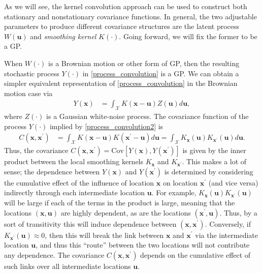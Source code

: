 \documentclass[12pt]{article}
\newcommand{\Cov}{\mathrm{Cov}}
\newcommand{\Ker}{K}
\newcommand{\covFun}{C}
\newcommand{\locSpace}{\mathcal{X}}
\newcommand{\loc}{\mathbf{x}}
\newcommand{\locTwo}{\loc^\prime}
\newcommand{\locDum}{\mathbf{u}}
\newcommand{\rf}{Y}
\begin{document}
As we will see, the kernel convolution approach can be used to construct both stationary and nonstationary covariance functions. In general, the two adjustable parameters to produce different 
covariance structures are the latent process $W(\locDum)$ and \textit{smoothing kernel} $\Ker(\cdot)$. Going forward, we will fix the former to be a GP. 

When $W(\cdot)$ is a Brownian motion or other form of GP, then the resulting stochastic process $\rf(\cdot)$ in \ref{process_convolution} is a 
GP. We can obtain a simpler equivalent representation of \ref{process_convolution} in the Brownian motion case via
\begin{align}
\rf(\loc) &= \int_{\locSpace} \Ker(\loc - \locDum) Z(\locDum) d\locDum, \label{process_convolution2}
\end{align}
where $Z(\cdot)$ is a Gaussian white-noise process. The covariance function of the process $\rf(\cdot)$ implied by \ref{process_convolution2} is 
\begin{align}
\covFun(\loc, \locTwo) &= \int_{\locSpace} \Ker(\loc - \locDum)\Ker(\locTwo - \locDum) d\locDum =  \int_{\locSpace} \Ker_{\loc}(\locDum)\Ker_{\locTwo}(\locDum) d\locDum. \label{process_convolution_kernel}
\end{align}
Thus, the covariance $\covFun(\loc, \locTwo) = \Cov[\rf(\loc), \rf(\locTwo)]$ is given by the inner product between the local smoothing kernels $\Ker_{\loc}$ and $\Ker_{\locTwo}$. 
This makes a lot of sense; the dependence between $\rf(\loc)$ and $\rf(\locTwo)$ is determined by considering the cumulative effect of the influence of location $\loc$ on location $\locTwo$ (and vice versa) 
indirectly through each intermediate location $\locDum$. For example, $\Ker_{\loc}(\locDum)\Ker_{\locTwo}(\locDum)$ will be large if each of the terms in the product is large, meaning that the locations 
$(\loc, \locDum)$ are highly dependent, as are the locations $(\locTwo, \locDum)$. Thus, by a sort of transitivity this will induce dependence between $(\loc, \locTwo)$. Conversely, if 
$\Ker_{\locTwo}(\locDum) \approx 0$, then this will break the link between $\loc$ and $\locTwo$ via the intermediate location $\locDum$, and thus this ``route'' between the two locations will not contribute 
any dependence. The covariance $\covFun(\loc, \locTwo)$ depends on the cumulative effect of such links over all intermediate locations $\locDum$. 
\end{document}

